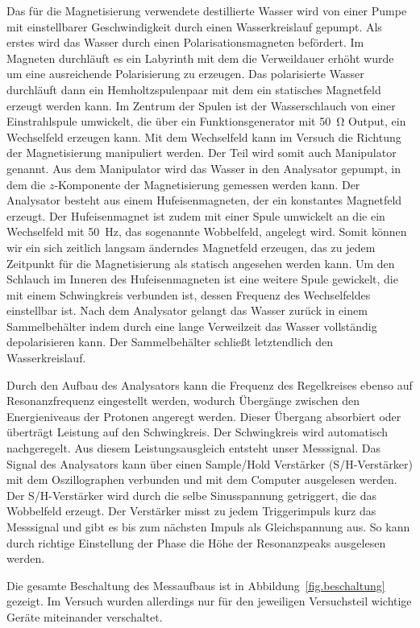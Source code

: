 \documentclass[paper=a4,
	fontsize=10pt,
	DIV=18,
	twocolumn,
	parskip=half
	]{scrartcl}
\numberwithin{equation}{section}    %
\begin{document}
Das für die Magnetisierung verwendete destillierte Wasser wird von einer Pumpe  mit einstellbarer Geschwindigkeit durch einen Wasserkreislauf gepumpt.
Als erstes wird das Wasser durch einen Polarisationsmagneten befördert. Im Magneten durchläuft es ein Labyrinth mit dem die Verweildauer erhöht wurde um eine ausreichende Polarisierung zu erzeugen.
Das polarisierte Wasser durchläuft dann ein Hemholtzspulenpaar mit dem ein statisches Magnetfeld erzeugt werden kann. Im Zentrum der Spulen ist der Wasserschlauch von einer Einstrahlspule umwickelt, die über ein Funktionsgenerator mit \SI{50}{\ohm} Output, ein Wechselfeld erzeugen kann. Mit dem Wechselfeld kann im Versuch die Richtung der Magnetisierung manipuliert werden. Der Teil wird somit auch Manipulator genannt.
Aus dem Manipulator wird das Wasser in den Analysator gepumpt, in dem die $z$-Komponente der Magnetisierung gemessen werden kann. Der Analysator besteht aus einem Hufeisenmagneten, der ein konstantes Magnetfeld erzeugt. Der Hufeisenmagnet ist zudem mit einer Spule umwickelt an die ein Wechselfeld mit \SI{50}{\hertz}, das sogenannte Wobbelfeld, angelegt wird. Somit können wir ein sich zeitlich langsam änderndes Magnetfeld erzeugen, das zu jedem Zeitpunkt für die Magnetisierung als statisch angesehen werden kann. Um den Schlauch im Inneren des Hufeisenmagneten ist eine weitere Spule gewickelt, die mit einem Schwingkreis verbunden ist, dessen Frequenz des Wechselfeldes einstellbar ist.
Nach dem Analysator gelangt das Wasser zurück in einem Sammelbehälter indem durch eine lange Verweilzeit das Wasser vollständig depolarisieren kann. Der Sammelbehälter schließt letztendlich den Wasserkreislauf.

Durch den Aufbau des Analysators kann die Frequenz des Regelkreises ebenso auf Resonanzfrequenz eingestellt werden, wodurch Übergänge zwischen den Energieniveaus der Protonen angeregt werden. Dieser Übergang absorbiert oder überträgt Leistung auf den Schwingkreis. Der Schwingkreis wird automatisch nachgeregelt. Aus diesem Leistungsausgleich entsteht unser Messsignal.
Das Signal des Analysators kann über einen Sample/Hold Verstärker (S/H-Verstärker) mit dem Oszillographen verbunden und mit dem Computer ausgelesen werden.
Der S/H-Verstärker wird durch die selbe Sinusspannung getriggert, die das Wobbelfeld erzeugt. Der Verstärker misst zu jedem Triggerimpuls kurz das Messsignal und gibt es bis zum nächsten Impuls als Gleichspannung aus. So kann durch richtige Einstellung der Phase die Höhe der Resonanzpeaks ausgelesen werden.

Die gesamte Beschaltung des Messaufbaus ist in Abbildung~\ref{fig.beschaltung} gezeigt. Im Versuch wurden allerdings nur für den jeweiligen Versuchsteil wichtige Geräte miteinander verschaltet.
\end{document}
